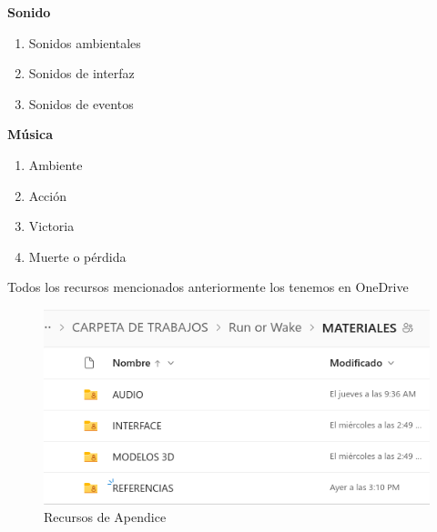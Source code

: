\textbf{Sonido}

\begin{enumerate}
	\item Sonidos ambientales
	\item Sonidos de interfaz
	\item Sonidos de eventos
\end{enumerate}

\textbf{Música}

\begin{enumerate}
	\item Ambiente
	\item Acción
	\item Victoria
	\item Muerte o pérdida
\end{enumerate}
\newpage
Todos los recursos mencionados anteriormente los tenemos en OneDrive
\begin{figure}
	\centering
	\includegraphics[width=1\textwidth]{Figures/0. General/apendice.png}
	\caption{Recursos de Apendice}
	\label{fig:apendice}
\end{figure}
